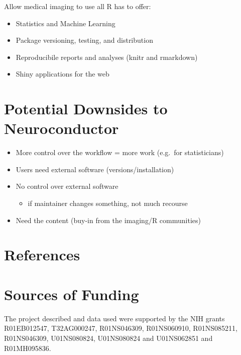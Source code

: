 \documentclass[final]{beamer}\usepackage[]{graphicx}\usepackage[]{color}
\begin{document}
\begin{frame}[fragile]
\begin{table}[!htb]
\begin{minipage}{0.21\linewidth}
Allow medical imaging to use all R has to offer:
  
\begin{itemize}
\item Statistics and Machine Learning
\item Package versioning, testing, and distribution
\item Reproducibile reports and analyses (knitr and rmarkdown)
\item Shiny applications for the web
\end{itemize}

\section{Potential Downsides to Neuroconductor}
\begin{itemize}
\item More control over the workflow = more work (e.g.~for statisticians)
\item Users need external software (versions/installation)
\item No control over external software
  \begin{itemize}
    \item if maintainer changes something, not much recourse
  \end{itemize}
\item Need the content (buy-in from the imaging/R communities)
\end{itemize}



\begin{center}
\end{center}
\vspace*{-0.8cm}
\section{References}
\setlength\bibitemsep{0pt}
\printbibliography[heading=none]\vspace*{-0.5cm}
\section{Sources of Funding}
{\scriptsize
The project described and data used were supported by the NIH grants R01EB012547, T32AG000247, R01NS046309, R01NS060910, R01NS085211, R01NS046309, U01NS080824, U01NS080824 and U01NS062851 and R01MH095836.
}
\end{minipage}
\hfill{\vrule width 5pt}\hfill
\begin{minipage}{0.40\linewidth}


\end{minipage}
\end{table}
\end{frame}
\end{document}
